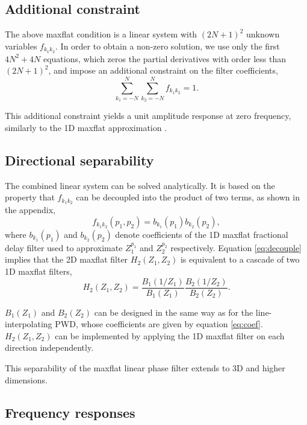 \subsection{Additional constraint}

The above maxflat condition is a linear system
with $(2N+1)^2$ unknown variables $f_{k_1k_2}$.
In order to obtain a non-zero solution, 
we use only the first $4N^2+4N$ equations,
which zeros the partial derivatives 
with order less than $(2N+1)^2$,
and impose an additional constraint on the filter coefficients,
\begin{equation}\label{eq:pcmf}
\sum_{k_1=-N}^N\sum_{k_2=-N}^Nf_{k_1k_2}=1.
\end{equation}

This additional constraint yields a
unit amplitude response at zero frequency,
similarly to the 1D maxflat approximation \cite[]{chen:2012a}.


\subsection{Directional separability}

The combined linear system can be solved analytically.  It
is based on the property that $f_{k_1k_2}$ can be
decoupled into the product of two terms, 
as shown in the appendix,
\begin{equation}\label{eq:decouple}
f_{k_1k_2}(p_1,p_2)=b_{k_1}(p_1)b_{k_2}(p_2),
\end{equation}
where $b_{k_1}(p_1)$ and $b_{k_2}(p_2)$ denote 
coefficients of the 1D maxflat fractional delay filter used 
to approximate $Z_1^{p_1}$ and $Z_2^{p_2}$ respectively.
Equation \ref{eq:decouple} implies 
that the 2D maxflat filter $H_2(Z_1,Z_2)$ is equivalent 
to a cascade of two 1D maxflat filters,
\begin{equation}
H_2(Z_1,Z_2)=
\frac{B_1(1/Z_1)}{B_1(Z_1)}
\frac{B_2(1/Z_2)}{B_2(Z_2)}.
\end{equation}

$B_1(Z_1)$ and $B_2(Z_2)$ can be designed
in the same way as for the line-interpolating PWD,
whose coefficients are given by
equation \ref{eq:coef}.
$H_2(Z_1,Z_2)$ can be implemented by applying the 1D maxflat filter 
on each direction independently.

This separability of the maxflat linear phase filter extends to
3D and higher dimensions.

\subsection{Frequency responses}

